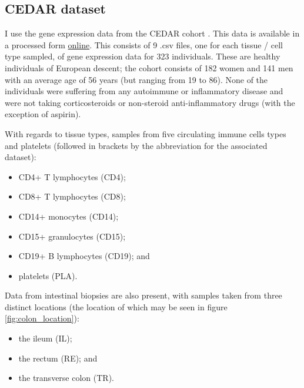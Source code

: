 \documentclass[12pt]{article} %
\begin{document}


	
	\subsection{CEDAR dataset}
	I use the gene expression data from the CEDAR cohort \citep{TheInternationalIBDGeneticsConsortiumIBDriskloci2018}. This data is available in a processed form \href{http://139.165.108.18/srv/genmol/permanent/1be6993fe41c12a051c9244d67c91da2be49e5dd26a6cd79f442bc006971e2ef/crohn-index.html}{online}. This consists of 9 .csv files, one for each tissue / cell type sampled, of gene expression data for 323 individuals. These are healthy individuals of European descent; the cohort consists of 182 women and 141 men with an average age of 56 years (but ranging from 19 to 86). None of the individuals were suffering from any autoimmune or inflammatory disease and were not taking corticosteroids or non-steroid anti-inflammatory drugs (with the exception of aspirin). 
	
	With regards to tissue types, samples from five circulating immune cells types and platelets (followed in brackets by the abbreviation for the associated dataset):
	\begin{itemize}
		\item CD4+ T lymphocytes (CD4);
		\item CD8+ T lymphocytes (CD8);
		\item CD14+ monocytes (CD14);
		\item CD15+ granulocytes (CD15);
		\item CD19+ B lymphocytes (CD19); and 
		\item platelets (PLA).
	\end{itemize}
	Data from intestinal biopsies are also present, with samples taken from three distinct locations (the location of which may be seen in figure \ref{fig:colon_location}):
	\begin{itemize}
		\item the ileum (IL);
		\item the rectum (RE); and
		\item the transverse colon (TR).
	\end{itemize} 
\end{document}
